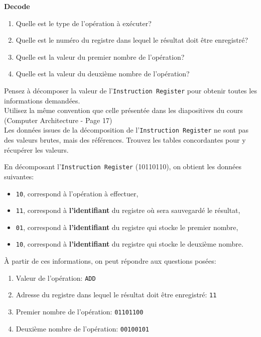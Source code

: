 \begin{Exercice}[10 minutes] \textbf{Decode}
    \begin{enumerate}
        \item Quelle est le type de l'opération à exécuter?
        \item Quelle est le numéro du registre dans lequel le résultat doit être enregistré?
        \item Quelle est la valeur du premier nombre de l'opération?
        \item Quelle est la valeur du deuxième nombre de l'opération?
    \end{enumerate}

    \begin{conseil}
        Pensez à décomposer la valeur de l'\lstinline{Instruction Register} pour obtenir toutes les informations demandées. \\
        Utilisez la même convention que celle présentée dans les diapositives du cours (Computer Architecture - Page 17) \\
        Les données issues de la décomposition de l'\lstinline{Instruction Register} ne sont pas des valeurs brutes, mais des références. Trouvez les tables concordantes pour y récupérer les valeurs.
    \end{conseil}

    \begin{solution}
        En décomposant l'\lstinline{Instruction Register} (10110110), on obtient les données suivantes:
        \begin{itemize}
            \item \lstinline{10}, correspond à l'opération à effectuer,
            \item \lstinline{11}, correspond à \textbf{l'identifiant} du registre où sera sauvegardé le résultat,
            \item \lstinline{01}, correspond à \textbf{l'identifiant} du registre qui stocke le premier nombre,
            \item \lstinline{10}, correspond à \textbf{l'identifiant} du registre qui stocke le deuxième nombre.\\
        \end{itemize}
        
    À partir de ces informations, on peut répondre aux questions posées:
       \begin{enumerate}
           \item Valeur de l'opération: \lstinline{ADD}
           \item Adresse du registre dans lequel le résultat doit être enregistré: \lstinline{11}
           \item Premier nombre de l'opération: \lstinline{01101100}
           \item Deuxième nombre de l'opération: \lstinline{00100101}
       \end{enumerate}
    \end{solution}
\end{Exercice}

